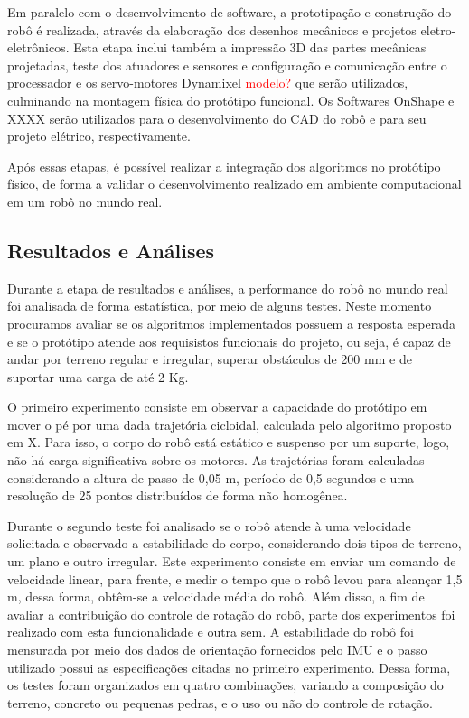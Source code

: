 \documentclass[../main.tex]{subfiles}
\begin{document}
  Em paralelo com o desenvolvimento de software, a prototipação e construção do robô é realizada, através da elaboração dos desenhos mecânicos e projetos eletro-eletrônicos. Esta etapa inclui também a impressão 3D das partes mecânicas projetadas, teste dos atuadores e sensores e configuração e comunicação entre o processador e os servo-motores Dynamixel \textcolor{red}{modelo?} que serão utilizados, culminando na montagem física do protótipo funcional. Os Softwares OnShape e XXXX serão utilizados para o desenvolvimento do CAD do robô e para seu projeto elétrico, respectivamente.

  Após essas etapas, é possível realizar a integração dos algoritmos no protótipo físico, de forma a validar o desenvolvimento realizado em ambiente computacional em um robô no mundo real.

  \subsection{Resultados e Análises}
  Durante a etapa de resultados e análises, a performance do robô no mundo real foi analisada de forma estatística, por meio de alguns testes. Neste momento procuramos avaliar se os algoritmos implementados possuem a resposta esperada e se o protótipo atende aos requisistos funcionais do projeto, ou seja, é capaz de andar por terreno regular e irregular, superar obstáculos  de 200 mm e de suportar uma carga de até 2 Kg.

  O primeiro experimento consiste em observar a capacidade do protótipo em mover o pé por uma dada trajetória cicloidal, calculada pelo algoritmo proposto em X. Para isso, o corpo do robô está estático e suspenso por um suporte, logo, não há carga significativa sobre os motores. As trajetórias foram calculadas considerando a altura de passo de 0,05 m, período de 0,5 segundos e uma resolução de 25 pontos distribuídos de forma não homogênea. 
  
  Durante o segundo teste foi analisado se o robô atende à uma velocidade solicitada e observado a estabilidade do corpo, considerando dois tipos de terreno, um plano e outro irregular. Este experimento consiste em enviar um comando de velocidade linear, para frente, e medir o tempo que o robô levou para alcançar 1,5 m, dessa forma, obtêm-se a velocidade média do robô.  Além disso, a fim de avaliar a contribuição do controle de rotação do robô, parte dos experimentos foi realizado com esta funcionalidade e outra sem. A estabilidade do robô foi mensurada por meio dos dados de orientação fornecidos pelo IMU e o passo utilizado possui as especificações citadas no primeiro experimento. Dessa forma, os testes foram organizados em quatro combinações, variando a composição do terreno, concreto ou pequenas pedras, e o uso ou não do controle de rotação.
  
\end{document}
